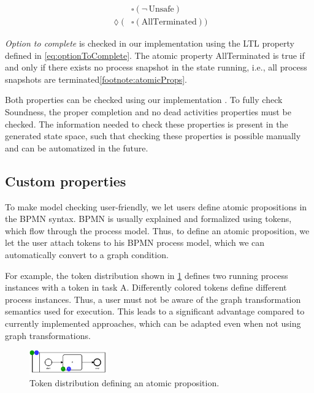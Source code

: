 \documentclass[adraft, copyright, creativecommons]{eptcs} %
\begin{document}
\begin{align}
    & \square (\neg \,\text{Unsafe}) \label{eq:safeness} \\
    \lozenge (& \square(\text{AllTerminated})) \label{eq:optionToComplete}
\end{align}

\emph{Option to complete} is checked in our implementation using the LTL property defined in \eqref{eq:optionToComplete}.
The atomic property \textsf{AllTerminated} is true if and only if there exists no process snapshot in the state running, i.e., all process snapshots are terminated\cref{footnote:atomicProps}.

Both properties can be checked using our implementation \cite{timkrauterArtifactsTERMGRAPH2022}.
To fully check Soundness, the proper completion and no dead activities properties must be checked.
The information needed to check these properties is present in the generated state space, such that checking these properties is possible manually and can be automatized in the future.
\subsection{Custom properties} \label{subsec:customProperties}

To make model checking user-friendly, we let users define atomic propositions in the BPMN syntax.
BPMN is usually explained and formalized using tokens, which flow through the process model.
Thus, to define an atomic proposition, we let the user attach tokens to his BPMN process model, which we can automatically convert to a graph condition.

For example, the token distribution shown in \cref{fig:atomicProposition} defines two running process instances with a token in task A.
Differently colored tokens define different process instances.
Thus, a user must not be aware of the graph transformation semantics used for execution.
This leads to a significant advantage compared to currently implemented approaches, which can be adapted even when not using graph transformations.

\begin{figure}[h]
    \centering
    \includegraphics[width=0.3\textwidth]{images/bpmn_semantics-atomicProp.pdf}
    \caption{Token distribution defining an atomic proposition.}
    \label{fig:atomicProposition}
\end{figure}
\end{document}
